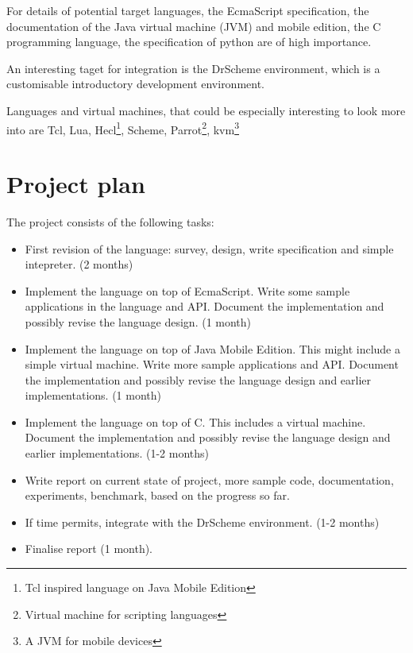 \documentclass[11pt]{article}
\begin{document}
For details of potential target languages, the EcmaScript specification\cite{ecma262}, the documentation of the 
Java virtual machine (JVM)\cite{jvm}  
and mobile edition\cite{j2me}, 
the C programming language\cite{knr}, 
the specification of python\cite{python} are of high importance. 

An interesting taget for integration is the DrScheme environment\cite{drscheme}, which is a customisable introductory development environment.

Languages and virtual machines, that could be especially interesting to look more into are Tcl\cite{tcl-tk}, 
Lua\cite{lua5}, 
Hecl\footnote{Tcl inspired language on Java Mobile Edition}\cite{Hecl}, 
Scheme\cite{r5rs}, 
Parrot\footnote{Virtual machine for scripting languages}\cite{parrot}, 
kvm\footnote{A JVM for mobile devices}\cite{kvm}


\section{Project plan}

The project consists of the following tasks:
\begin{itemize}
\item First revision of the language: survey, design, write specification and simple intepreter. (2 months)
\item Implement the language on top of EcmaScript. Write some sample applications in the language and API. Document the implementation and possibly revise the language design. (1 month)
\item Implement the language on top of Java Mobile Edition. This might include a simple virtual machine. Write more sample applications and API. Document the implementation and possibly revise the language design and earlier implementations. (1 month)
\item Implement the language on top of C. This includes a virtual machine. Document the implementation and possibly revise the language design and earlier implementations. (1-2 months)
\item Write report on current state of project, more sample code, documentation, experiments, benchmark, based on the progress so far. 
\item If time permits, integrate with the DrScheme environment. (1-2 months)
\item Finalise report (1 month).
\end{itemize}
\end{document}
